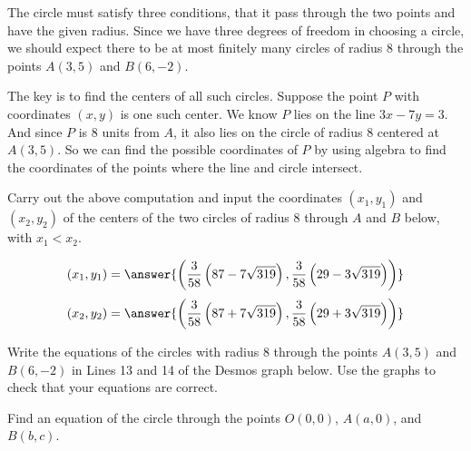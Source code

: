 \documentclass{ximera}
\begin{document}
\begin{explanation}
The circle must satisfy three conditions, that it pass through the two points and have the given radius. Since we have three degrees of freedom in choosing a circle, we should expect there to be at most finitely many circles of radius 8 through the points $A(3,5)$ and $B(6,-2)$.

The key is to find the centers of all such circles. Suppose the point $P$ with coordinates $(x,y)$ is one such center. We know $P$ lies on the line $3x-7y=3$. And since $P$ is 8 units from $A$, it also lies on the circle of radius $8$ centered at $A(3,5)$. So we can find the possible coordinates of $P$ by using algebra to find the coordinates of the points where the line and circle intersect.

Carry out the above computation and input the coordinates $(x_1, y_1)$ and $(x_2,y_2)$ of the centers of the two circles of radius 8 through $A$ and $B$ below, with $x_1 < x_2$. 

\begin{question} 
\[
  (x_1, y_1) = \answer{\left( \frac{3}{58}\left( 87-7\sqrt{319}\right), \frac{3}{58}\left( 29-3\sqrt{319}\right) \right)} 
\]
\[
  (x_2, y_2) = \answer{\left( \frac{3}{58}\left( 87+7\sqrt{319}\right), \frac{3}{58}\left( 29+3\sqrt{319}\right) \right)} 
\]
\end{question}



\begin{exploration}\label{exp:circle6}
Write the equations of the circles with radius 8 through the points $A(3,5)$ and $B(6,-2)$ in Lines 13 and 14 of the Desmos graph below. Use the graphs to check that your equations are correct.
 
 
\begin{onlineOnly}
    \begin{center}
\end{center}
\end{onlineOnly}
\end{exploration}

\end{explanation}



\begin{example}  \label{Ex7}
Find an equation of the circle through the points $O(0,0)$, $A(a,0)$, and $B(b,c)$.
\end{example}
\end{document}
